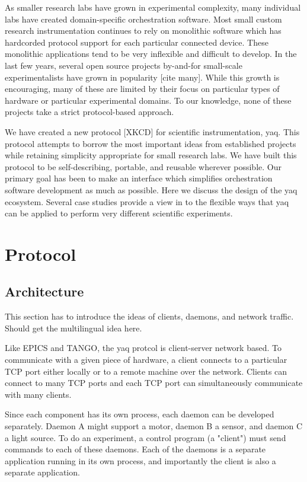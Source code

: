 \documentclass[aip, amsmath, amssymb, reprint,]{revtex4-1}
\begin{document}
As smaller research labs have grown in experimental complexity, many individual labs have created domain-specific orchestration software.
Most small custom research instrumentation continues to rely on monolithic software which has hardcorded protocol support for each particular connected device.
These monolithic applications tend to be very inflexible and difficult to develop.
In the last few years, several open source projects by-and-for small-scale experimentalists have grown in popularity [cite many].
While this growth is encouraging, many of these are limited by their focus on particular types of hardware or particular experimental domains.
To our knowledge, none of these projects take a strict protocol-based approach.

We have created a new protocol [XKCD] for scientific instrumentation, yaq.
This protocol attempts to borrow the most important ideas from established projects while retaining simplicity appropriate for small research labs.
We have built this protocol to be self-describing, portable, and reusable wherever possible.
Our primary goal has been to make an interface which simplifies orchestration software development as much as possible.
Here we discuss the design of the yaq ecosystem.
Several case studies provide a view in to the flexible ways that yaq can be applied to perform very different scientific experiments.

\section{Protocol}

\subsection{Architecture}

This section has to introduce the ideas of clients, daemons, and network traffic.
Should get the multilingual idea here.

Like EPICS and TANGO, the yaq protcol is client-server network based.
To communicate with a given piece of hardware, a client connects to a particular TCP port either locally or to a remote machine over the network.
Clients can connect to many TCP ports and each TCP port can simultaneously communicate with many clients.

Since each component has its own process, each daemon can be developed separately.
Daemon A might support a motor, daemon B a sensor, and daemon C a light source.
To do an experiment, a control program (a "client") must send commands to each of these daemons.
Each of the daemons is a separate application running in its own process, and importantly the client is also a separate application.
\end{document}
